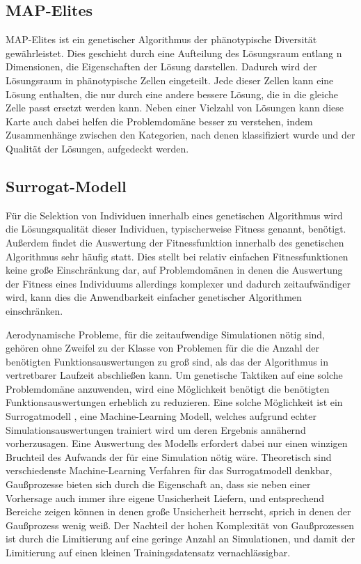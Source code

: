 \documentclass[12pt]{article}
\begin{document}
\subsection{MAP-Elites}
\label{sub:mapElites}
MAP-Elites \cite{Mouret.4202015} ist ein genetischer Algorithmus der phänotypische Diversität gewährleistet.
Dies geschieht durch eine Aufteilung des Lösungsraum entlang n Dimensionen, die Eigenschaften der Lösung darstellen.
Dadurch wird der Lösungsraum in phänotypische Zellen eingeteilt.
Jede dieser Zellen kann eine Lösung enthalten, die nur durch eine andere bessere Lösung, die in die gleiche Zelle passt ersetzt werden kann.
Neben einer Vielzahl von Lösungen kann diese Karte auch dabei helfen die Problemdomäne besser zu verstehen, indem Zusammenhänge zwischen den Kategorien, nach denen klassifiziert wurde und der Qualität der Lösungen, aufgedeckt werden.

\subsection{Surrogat-Modell}
\label{sub:surrogate}
Für die Selektion von Individuen innerhalb eines genetischen Algorithmus wird die Lösungsqualität dieser Individuen, typischerweise Fitness genannt, benötigt.
Außerdem findet die Auswertung der Fitnessfunktion innerhalb des genetischen Algorithmus sehr häufig statt.
Dies stellt bei relativ einfachen Fitnessfunktionen keine große Einschränkung dar, auf Problemdomänen in denen die Auswertung der Fitness eines Individuums allerdings komplexer und dadurch zeitaufwändiger wird, kann dies die Anwendbarkeit einfacher genetischer Algorithmen einschränken.

Aerodynamische Probleme, für die zeitaufwendige Simulationen nötig sind, gehören ohne Zweifel zu der Klasse von Problemen für die die Anzahl der benötigten Funktionsauswertungen zu groß sind, als das der Algorithmus in vertretbarer Laufzeit abschließen kann.
Um genetische Taktiken auf eine solche Problemdomäne anzuwenden, wird eine Möglichkeit benötigt die benötigten Funktionsauswertungen erheblich zu reduzieren.
Eine solche Möglichkeit ist ein Surrogatmodell \cite{Jin.2011}\cite{Preen.2016}, eine Machine-Learning Modell, welches aufgrund echter Simulationsauswertungen trainiert wird um deren Ergebnis annähernd vorherzusagen.
Eine Auswertung des Modells erfordert dabei nur einen winzigen Bruchteil des Aufwands der für eine Simulation nötig wäre.
Theoretisch sind verschiedenste Machine-Learning Verfahren für das Surrogatmodell denkbar, Gaußprozesse bieten sich durch die Eigenschaft an, dass sie neben einer Vorhersage auch immer ihre eigene Unsicherheit Liefern, und entsprechend Bereiche zeigen können in denen große Unsicherheit herrscht, sprich in denen der Gaußprozess wenig weiß.
Der Nachteil der hohen Komplexität von Gaußprozessen  ist durch die Limitierung auf eine geringe Anzahl an Simulationen, und damit der Limitierung auf einen kleinen Trainingsdatensatz vernachlässigbar.
\end{document}
